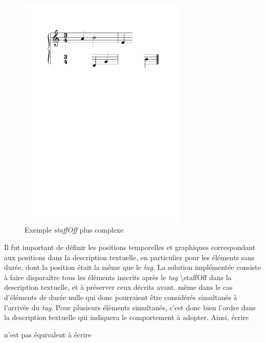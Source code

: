 \documentclass{article}
\newenvironment{gmncode}	{\vspace{-2mm}\small\verbatim}{\endverbatim\vspace{-2mm}}
\begin{document}

\begin{figure}[h]
\centering
\includegraphics[width=8cm]{img/staffoffexotique.pdf}
\caption{ Exemple \emph{staffOff} plus complexe}
\label{fig:staffoffexotique}
\end{figure}

Il fut important de définir les positions temporelles et graphiques correspondant aux positions dans la description textuelle, en particulier pour les éléments sans durée, dont la position était la même que le \emph{tag}. La solution implémentée consiste à faire disparaître tous les éléments inscrits après le \emph{tag} \textbackslash{}staffOff dans la description textuelle, et à préserver ceux décrits avant, même dans le cas d'éléments de durée nulle qui donc pourraient être considérés simultanés à l'arrivée du \emph{tag}. Pour plusieurs éléments simultanés, c'est donc bien l'ordre dans la description textuelle qui indiquera le comportement à adopter. Ainsi, écrire 

\begin{center}
\begin{gmncode}
[\meter<"4/4">\clef\staffOff a b\staffOn c]
\end{gmncode}
\bigskip

n'est pas équivalent à écrire 
\\
\begin{gmncode}
[\staffOff\meter<"4/4">\clef a b\staffOn c]
\end{gmncode} 
\end{center}
\end{document}
